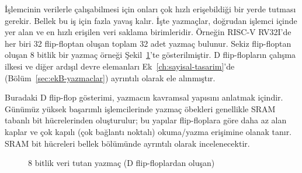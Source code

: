 İşlemcinin verilerle çalışabilmesi için onları çok hızlı erişebildiği bir yerde tutması gerekir. Bellek bu iş için fazla yavaş kalır. İşte yazmaçlar, doğrudan işlemci içinde yer alan ve en hızlı erişilen veri saklama birimleridir. Örneğin RISC-V RV32I'de her biri 32 flip-floptan oluşan toplam 32 adet yazmaç bulunur. Sekiz flip-floptan oluşan 8 bitlik bir yazmaç örneği Şekil~\ref{fig:8bit-yazmac}'te gösterilmiştir. D flip-flopların çalışma ilkesi ve diğer ardışıl devre elemanları Ek~\ref{ch:sayisal-tasarim}'de (Bölüm~\ref{sec:ekB-yazmaclar}) ayrıntılı olarak ele alınmıştır.

Buradaki D flip-flop gösterimi, yazmacın kavramsal yapısını anlatmak içindir. Günümüz yüksek başarımlı işlemcilerinde yazmaç öbekleri genellikle SRAM tabanlı bit hücrelerinden oluşturulur; bu yapılar flip-floplara göre daha az alan kaplar ve çok kapılı (çok bağlantı noktalı) okuma/yazma erişimine olanak tanır. SRAM bit hücreleri bellek bölümünde ayrıntılı olarak incelenecektir.

\begin{figure}[H]
\centering
{}
\caption{8 bitlik veri tutan yazmaç (D flip-floplardan oluşan)}
\label{fig:8bit-yazmac}
\end{figure}

